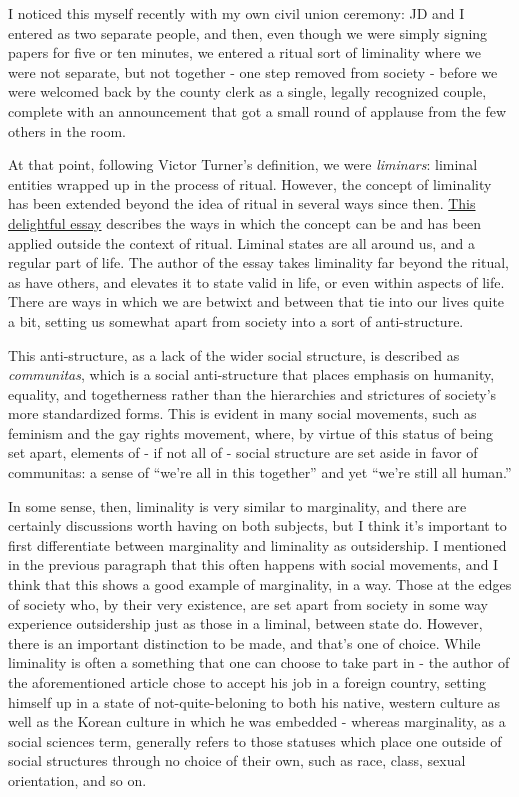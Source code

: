 I noticed this myself recently with my own civil union ceremony: JD and
I entered as two separate people, and then, even though we were simply
signing papers for five or ten minutes, we entered a ritual sort of
liminality where we were not separate, but not together - one step
removed from society - before we were welcomed back by the county clerk
as a single, legally recognized couple, complete with an announcement
that got a small round of applause from the few others in the room.

At that point, following Victor Turner's definition, we were
\emph{liminars}: liminal entities wrapped up in the process of ritual.
However, the concept of liminality has been extended beyond the idea of
ritual in several ways since then.
\href{http://www.liminality.org/about/whatisliminality}{This delightful
essay} describes the ways in which the concept can be and has been
applied outside the context of ritual. Liminal states are all around us,
and a regular part of life. The author of the essay takes liminality far
beyond the ritual, as have others, and elevates it to state valid in
life, or even within aspects of life. There are ways in which we are
betwixt and between that tie into our lives quite a bit, setting us
somewhat apart from society into a sort of anti-structure.

This anti-structure, as a lack of the wider social structure, is
described as \emph{communitas}, which is a social anti-structure that
places emphasis on humanity, equality, and togetherness rather than the
hierarchies and strictures of society's more standardized forms. This is
evident in many social movements, such as feminism and the gay rights
movement, where, by virtue of this status of being set apart, elements
of - if not all of - social structure are set aside in favor of
communitas: a sense of ``we're all in this together'' and yet ``we're
still all human.''

In some sense, then, liminality is very similar to marginality, and
there are certainly discussions worth having on both subjects, but I
think it's important to first differentiate between marginality and
liminality as outsidership. I mentioned in the previous paragraph that
this often happens with social movements, and I think that this shows a
good example of marginality, in a way. Those at the edges of society
who, by their very existence, are set apart from society in some way
experience outsidership just as those in a liminal, between state do.
However, there is an important distinction to be made, and that's one of
choice. While liminality is often a something that one can choose to
take part in - the author of the aforementioned article chose to accept
his job in a foreign country, setting himself up in a state of
not-quite-beloning to both his native, western culture as well as the
Korean culture in which he was embedded - whereas marginality, as a
social sciences term, generally refers to those statuses which place one
outside of social structures through no choice of their own, such as
race, class, sexual orientation, and so on.

